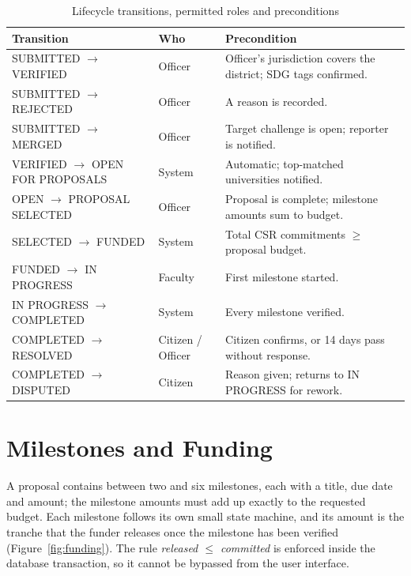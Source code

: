 \begin{table}[H]
\centering
\caption{Lifecycle transitions, permitted roles and preconditions}
\label{tab:transitions}
\small
\begin{tabularx}{\textwidth}{@{}L{5.2cm}L{2.4cm}X@{}}
\toprule
\textbf{Transition} & \textbf{Who} & \textbf{Precondition} \\
\midrule
SUBMITTED $\rightarrow$ VERIFIED & Officer & Officer's jurisdiction covers the district; SDG tags confirmed. \\
SUBMITTED $\rightarrow$ REJECTED & Officer & A reason is recorded. \\
SUBMITTED $\rightarrow$ MERGED & Officer & Target challenge is open; reporter is notified. \\
VERIFIED $\rightarrow$ OPEN FOR PROPOSALS & System & Automatic; top-matched universities notified. \\
OPEN $\rightarrow$ PROPOSAL SELECTED & Officer & Proposal is complete; milestone amounts sum to budget. \\
SELECTED $\rightarrow$ FUNDED & System & Total CSR commitments $\geq$ proposal budget. \\
FUNDED $\rightarrow$ IN PROGRESS & Faculty & First milestone started. \\
IN PROGRESS $\rightarrow$ COMPLETED & System & Every milestone verified. \\
COMPLETED $\rightarrow$ RESOLVED & Citizen / Officer & Citizen confirms, or 14 days pass without response. \\
COMPLETED $\rightarrow$ DISPUTED & Citizen & Reason given; returns to IN PROGRESS for rework. \\
\bottomrule
\end{tabularx}
\end{table}

\section{Milestones and Funding}
A proposal contains between two and six milestones, each with a title, due date and amount; the milestone amounts must add up exactly to the requested budget. Each milestone follows its own small state machine, and its amount is the tranche that the funder releases once the milestone has been verified (Figure~\ref{fig:funding}). The rule \emph{released $\leq$ committed} is enforced inside the database transaction, so it cannot be bypassed from the user interface.

